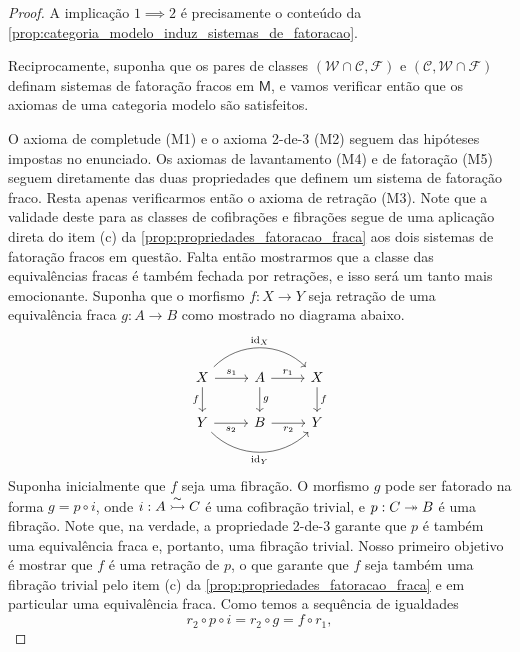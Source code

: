 \begin{proof}
  A implicação $1 \implies 2$ é precisamente o conteúdo da \cref{prop:categoria_modelo_induz_sistemas_de_fatoracao}.

  Reciprocamente, suponha que os pares de classes $(\mathcal{W} \cap \mathcal{C},\mathcal{F})$ e $(\mathcal{C},\mathcal{W} \cap \mathcal{F})$ definam sistemas de fatoração fracos em $\mathsf{M}$, e vamos verificar então que os axiomas de uma categoria modelo são satisfeitos.
  
  O axioma de completude (M1) e o axioma 2-de-3 (M2) seguem das hipóteses impostas no enunciado.
  Os axiomas de lavantamento (M4) e de fatoração (M5) seguem diretamente das duas propriedades que definem um sistema de fatoração fraco.
  Resta apenas verificarmos então o axioma de retração (M3).
  Note que a validade deste para as classes de cofibrações e fibrações segue de uma aplicação direta do item (c) da \cref{prop:propriedades_fatoracao_fraca} aos dois sistemas de fatoração fracos em questão.
  Falta então mostrarmos que a classe das equivalências fracas é também fechada por retrações, e isso será um tanto mais emocionante.
  Suponha que o morfismo $f: X \to Y$ seja retração de uma equivalência fraca $g: A \to B$ como mostrado no diagrama abaixo.
  \begin{displaymath}
    \begin{tikzcd}
      X
      \arrow[d, "f" swap]
      \arrow[r, "s_{1}"]
      \arrow[rr, bend left=45, "\id_{X}"]
      & A
      \arrow[d, "g"]
      \arrow[r, "r_{1}"]
      & X
      \arrow[d, "f"]
      \\ Y
      \arrow[r, "s_{2}" swap]
      \arrow[rr, bend right=45, "\id_{Y}" swap]
      & B
      \arrow[r, "r_{2}" swap]
      & Y
    \end{tikzcd}
  \end{displaymath}
  Suponha inicialmente que $f$ seja uma fibração.
  O morfismo $g$ pode ser fatorado na forma $g = p \circ i$, onde $i: A \overset{\sim}{\rightarrowtail} C$ é uma cofibração trivial, e $p: C \twoheadrightarrow B$ é uma fibração.
  Note que, na verdade, a propriedade 2-de-3 garante que $p$ é também uma equivalência fraca e, portanto, uma fibração trivial.
  Nosso primeiro objetivo é mostrar que $f$ é uma retração de $p$, o que garante que $f$ seja também uma fibração trivial pelo item (c) da \cref{prop:propriedades_fatoracao_fraca} e em particular uma equivalência fraca.
  Como temos a sequência de igualdades
  \begin{displaymath}
    r_{2} \circ p \circ i = r_{2} \circ g = f \circ r_{1},

\end{displaymath}
\end{proof}

